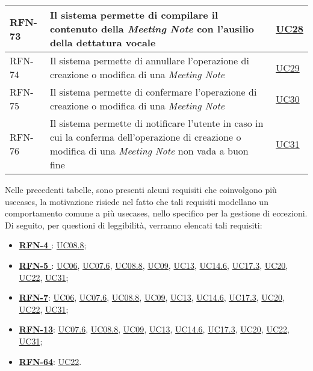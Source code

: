 \begin{table}
\begin{tabularx}{\textwidth}{lXl}
    \hline
    RFN-73 \label{RFN-73} & Il sistema permette di compilare il contenuto della \emph{Meeting Note} con l'ausilio della dettatura vocale & \hyperref[UC28]{UC28} \\
    \hline
    RFN-74 \label{RFN-74} & Il sistema permette di annullare l'operazione di creazione o modifica di una \emph{Meeting Note} & \hyperref[UC29]{UC29} \\
    \hline
    RFN-75 \label{RFN-75} & Il sistema permette di confermare l'operazione di creazione o modifica di una \emph{Meeting Note} & \hyperref[UC30]{UC30} \\
    \hline
    RFN-76 \label{RFN-76} & Il sistema permette di notificare l'utente in caso in cui la conferma dell'operazione di creazione o modifica di una \emph{Meeting Note} non vada a buon fine & \hyperref[UC31]{UC31} \\
\end{tabularx}
\end{table}

\clearpage

Nelle precedenti tabelle, sono presenti alcuni requisiti che coinvolgono più \glspl{usecase}\glsoccur, la motivazione risiede nel fatto che tali requisiti modellano un comportamento comune a più \glspl{usecase}\glsoccur, nello specifico per la gestione di eccezioni.\\
Di seguito, per questioni di leggibilità, verranno elencati tali requisiti:
\begin{itemize}
    \item \textbf{\hyperref[RFN-4]{RFN-4 }}: \hyperref[UC08.8]{UC08.8};
    \item \textbf{\hyperref[RFN-5]{RFN-5 }}: \hyperref[UC06]{UC06}, \hyperref[UC07.6]{UC07.6}, \hyperref[UC08.8]{UC08.8}, \hyperref[UC09]{UC09}, \hyperref[UC13]{UC13}, \hyperref[UC14.6]{UC14.6}, \hyperref[UC17.3]{UC17.3}, \hyperref[UC20]{UC20}, \hyperref[UC22]{UC22}, \hyperref[UC31]{UC31};
    \item \textbf{\hyperref[RFN-7]{RFN-7}}: \hyperref[UC06]{UC06}, \hyperref[UC07.6]{UC07.6}, \hyperref[UC08.8]{UC08.8}, \hyperref[UC09]{UC09}, \hyperref[UC13]{UC13}, \hyperref[UC14.6]{UC14.6}, \hyperref[UC17.3]{UC17.3}, \hyperref[UC20]{UC20}, \hyperref[UC22]{UC22}, \hyperref[UC31]{UC31};
    \item \textbf{\hyperref[RFN-13]{RFN-13}}: \hyperref[UC07.6]{UC07.6}, \hyperref[UC08.8]{UC08.8}, \hyperref[UC09]{UC09}, \hyperref[UC13]{UC13}, \hyperref[UC14.6]{UC14.6}, \hyperref[UC17.3]{UC17.3}, \hyperref[UC20]{UC20}, \hyperref[UC22]{UC22}, \hyperref[UC31]{UC31};
    \item \textbf{\hyperref[RFN-64]{RFN-64}}: \hyperref[UC22]{UC22}.
\end{itemize}

